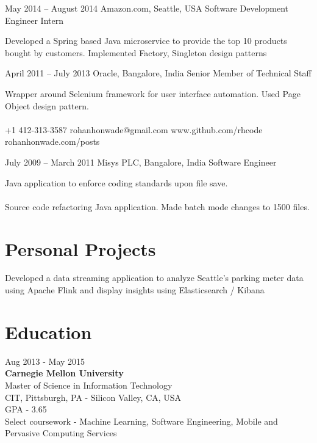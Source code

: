 \documentclass{tccv}
\begin{document}
\begin{eventlist}
\item{May 2014 -- August 2014}
     {Amazon.com, Seattle, USA}
     {Software Development Engineer Intern}

Developed a Spring based Java microservice to provide the top 10 products bought by customers. Implemented Factory, Singleton design patterns

\item{April 2011 -- July 2013}
     {Oracle, Bangalore, India}
     {Senior Member of Technical Staff}

Wrapper around Selenium framework for user interface automation. Used Page Object design pattern.\\
\\

    {+1 412-313-3587}
    {rohanhonwade@gmail.com}
    {www.github.com/rhcode}
    {rohanhonwade.com/posts}

\item{July 2009 -- March 2011}
     {Misys PLC, Bangalore, India}
     {Software Engineer}

Java application to enforce coding standards upon file save.\\
\\

Source code refactoring Java application. Made batch mode changes to 1500 files.\\
\end{eventlist}

\vspace{-0.2in}
\section{Personal Projects}
Developed a data streaming application to analyze Seattle's parking meter data using Apache Flink and display insights using Elasticsearch / Kibana


\section{Education}

{\hfill\sc Aug 2013 - May 2015}\\
\textbf{Carnegie Mellon University}\\ 
Master of Science in Information Technology\\
CIT, Pittsburgh, PA - Silicon Valley, CA, USA\\
GPA - 3.65\\
Select coursework - Machine Learning, Software Engineering, Mobile and Pervasive Computing Services\\
\end{document}
